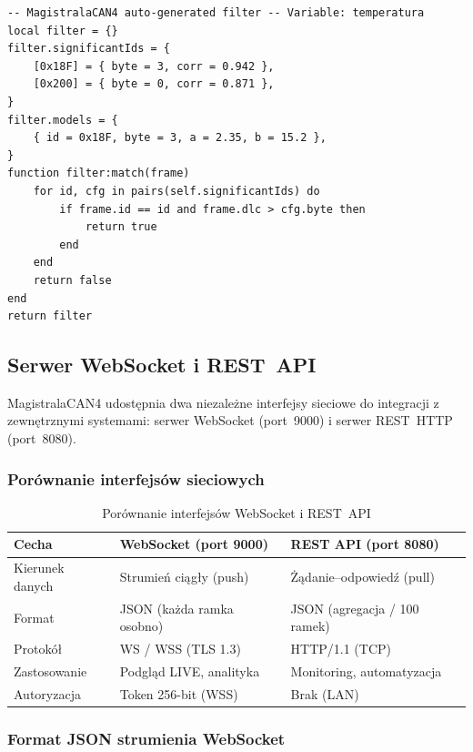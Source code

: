 \documentclass[12pt, a4paper]{article}
\begin{document}
\begin{lstlisting}[style=cpp, caption={Auto-wygenerowany skrypt filtrujacy (AssociativeLearner)}]
-- MagistralaCAN4 auto-generated filter -- Variable: temperatura
local filter = {}
filter.significantIds = {
    [0x18F] = { byte = 3, corr = 0.942 },
    [0x200] = { byte = 0, corr = 0.871 },
}
filter.models = {
    { id = 0x18F, byte = 3, a = 2.35, b = 15.2 },
}
function filter:match(frame)
    for id, cfg in pairs(self.significantIds) do
        if frame.id == id and frame.dlc > cfg.byte then
            return true
        end
    end
    return false
end
return filter
\end{lstlisting}

\subsection{Serwer WebSocket i REST~API}

MagistralaCAN4 udostępnia dwa niezależne interfejsy sieciowe do integracji
z zewnętrznymi systemami: serwer WebSocket (port~9000) i serwer REST~HTTP
(port~8080).

\subsubsection*{Porównanie interfejsów sieciowych}

\begin{table}[H]
\caption{Porównanie interfejsów WebSocket i REST~API}
\label{tab:netcomp}
\centering
\small
\begin{tabular}{p{3.5cm}p{5.5cm}p{5.5cm}}
\toprule
\textbf{Cecha} & \textbf{WebSocket (port 9000)} & \textbf{REST API (port 8080)} \\
\midrule
Kierunek danych    & Strumień ciągły (push)    & Żądanie--odpowiedź (pull) \\
Format             & JSON (każda ramka osobno) & JSON (agregacja / 100 ramek) \\
Protokół           & WS / WSS (TLS 1.3)        & HTTP/1.1 (TCP) \\
Zastosowanie       & Podgląd LIVE, analityka   & Monitoring, automatyzacja \\
Autoryzacja        & Token 256-bit (WSS)       & Brak (LAN) \\
\bottomrule
\end{tabular}
\end{table}

\subsubsection*{Format JSON strumienia WebSocket}
\end{document}
